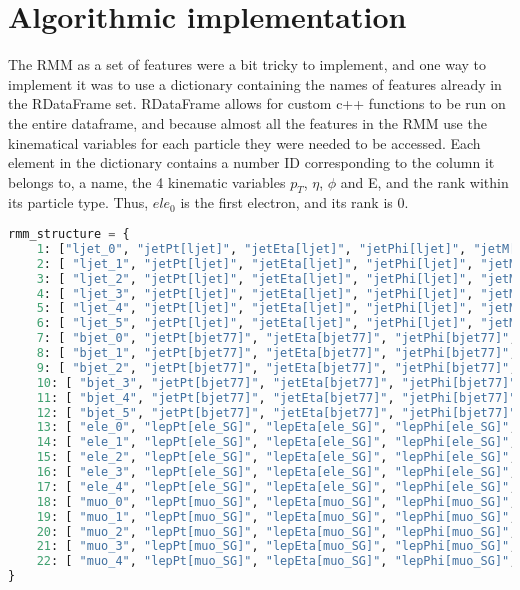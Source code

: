 \section{Algorithmic implementation}

The RMM as a set of features were a bit tricky to implement, and one way to implement it was 
to use a dictionary containing the names of features already in the RDataFrame set. RDataFrame 
allows for custom c++ functions to be run on the entire dataframe, and because almost all the 
features in the RMM use the kinematical variables for each particle they were needed to 
be accessed. Each element in the dictionary contains a number ID corresponding to the column 
it belongs to, a name, the 4 kinematic variables $p_T$, $\eta$, $\phi$ and E, and the rank 
within its particle type. Thus, $ele_0$ is the first electron, and its rank is 0. 

\begin{lstlisting}[language=Python, style=pythonstyle, label={code:rmm_dict_struct}]
rmm_structure = {
    1: ["ljet_0", "jetPt[ljet]", "jetEta[ljet]", "jetPhi[ljet]", "jetM[ljet]", 0,],
    2: [ "ljet_1", "jetPt[ljet]", "jetEta[ljet]", "jetPhi[ljet]", "jetM[ljet]", 1,],
    3: [ "ljet_2", "jetPt[ljet]", "jetEta[ljet]", "jetPhi[ljet]", "jetM[ljet]", 2,],
    4: [ "ljet_3", "jetPt[ljet]", "jetEta[ljet]", "jetPhi[ljet]", "jetM[ljet]", 3,],
    5: [ "ljet_4", "jetPt[ljet]", "jetEta[ljet]", "jetPhi[ljet]", "jetM[ljet]", 4,],
    6: [ "ljet_5", "jetPt[ljet]", "jetEta[ljet]", "jetPhi[ljet]", "jetM[ljet]", 5,],
    7: [ "bjet_0", "jetPt[bjet77]", "jetEta[bjet77]", "jetPhi[bjet77]", "jetM[bjet77]", 0,],
    8: [ "bjet_1", "jetPt[bjet77]", "jetEta[bjet77]", "jetPhi[bjet77]", "jetM[bjet77]", 1,],
    9: [ "bjet_2", "jetPt[bjet77]", "jetEta[bjet77]", "jetPhi[bjet77]", "jetM[bjet77]", 2,],
    10: [ "bjet_3", "jetPt[bjet77]", "jetEta[bjet77]", "jetPhi[bjet77]", "jetM[bjet77]", 3,],
    11: [ "bjet_4", "jetPt[bjet77]", "jetEta[bjet77]", "jetPhi[bjet77]", "jetM[bjet77]", 4,],
    12: [ "bjet_5", "jetPt[bjet77]", "jetEta[bjet77]", "jetPhi[bjet77]", "jetM[bjet77]", 5,],
    13: [ "ele_0", "lepPt[ele_SG]", "lepEta[ele_SG]", "lepPhi[ele_SG]", "lepM[ele_SG]", 0,],
    14: [ "ele_1", "lepPt[ele_SG]", "lepEta[ele_SG]", "lepPhi[ele_SG]", "lepM[ele_SG]", 1,],
    15: [ "ele_2", "lepPt[ele_SG]", "lepEta[ele_SG]", "lepPhi[ele_SG]", "lepM[ele_SG]", 2,],
    16: [ "ele_3", "lepPt[ele_SG]", "lepEta[ele_SG]", "lepPhi[ele_SG]", "lepM[ele_SG]", 3,],
    17: [ "ele_4", "lepPt[ele_SG]", "lepEta[ele_SG]", "lepPhi[ele_SG]", "lepM[ele_SG]", 4,],
    18: [ "muo_0", "lepPt[muo_SG]", "lepEta[muo_SG]", "lepPhi[muo_SG]", "lepM[muo_SG]", 0,],
    19: [ "muo_1", "lepPt[muo_SG]", "lepEta[muo_SG]", "lepPhi[muo_SG]", "lepM[muo_SG]", 1,],
    20: [ "muo_2", "lepPt[muo_SG]", "lepEta[muo_SG]", "lepPhi[muo_SG]", "lepM[muo_SG]", 2,],
    21: [ "muo_3", "lepPt[muo_SG]", "lepEta[muo_SG]", "lepPhi[muo_SG]", "lepM[muo_SG]", 3,],
    22: [ "muo_4", "lepPt[muo_SG]", "lepEta[muo_SG]", "lepPhi[muo_SG]", "lepM[muo_SG]", 4,],
}      

\end{lstlisting}
 
